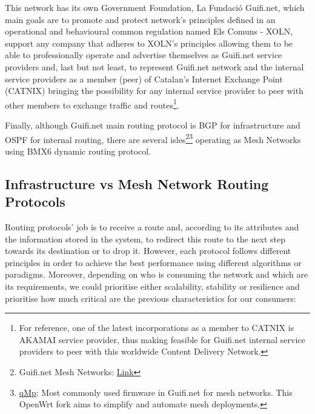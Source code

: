 This network has its own Government Foundation, La Fundació Guifi.net, which main goals are to promote and protect network's principles defined in an operational and behavioural common regulation named Els Comuns - XOLN, support any company that adheres to XOLN's principles allowing them to be able to professionally operate and advertise themselves as Guifi.net service providers and, last but not least, to represent Guifi.net network and the internal service providers as a member (peer) of Catalan's Internet Exchange Point (CATNIX) bringing the possibility for any internal service provider to peer with other members to exchange traffic and routes\footnote{For reference, one of the latest incorporations as a member to CATNIX is AKAMAI service provider, thus making feasible for Guifi.net internal service providers to peer with this worldwide Content Delivery Network.}.

Finally, although Guifi.net main routing protocol is BGP for infrastructure and OSPF for internal routing, there are several isles\footnote{Guifi.net Mesh Networks: \href{http://ca.wiki.guifi.net/wiki/Annex:subxarxes_mesh}{Link}}\footnote{\href{http://qmp.party/Documentation}{qMp}: Most commonly used firmware in Guifi.net for mesh networks. This OpenWrt fork aims to simplify and automate mesh deployments.} operating as Mesh Networks using BMX6 dynamic routing protocol.


\subsection{Infrastructure vs Mesh Network Routing Protocols}
\label{subsec:dsrp}
Routing protocols' job is to receive a route and, according to its attributes and the information stored in the system, to redirect this route to the next step towards its destination or to drop it. However, each protocol follows different principles in order to achieve the best performance using different algorithms or paradigms. Moreover, depending on who is consuming the network and which are its requirements, we could prioritise either scalability, stability or resilience and prioritise how much critical are the previous characteristics for our consumers:

